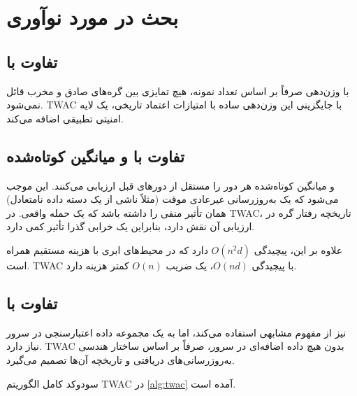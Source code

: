 \section{بحث در مورد نوآوری}
\label{sec:innovation_discussion}

\subsection{تفاوت با }

 با وزن‌دهی صرفاً بر اساس تعداد نمونه، هیچ تمایزی بین گره‌های صادق و مخرب قائل نمی‌شود. \gls{TWAC} با جایگزینی این وزن‌دهی ساده با امتیازات اعتماد تاریخی، یک لایه امنیتی تطبیقی اضافه می‌کند.

\subsection{تفاوت با  و میانگین کوتاه‌شده}

 و میانگین کوتاه‌شده هر دور را مستقل از دورهای قبل ارزیابی می‌کنند. این موجب می‌شود که یک به‌روزرسانی غیرعادی موقت (مثلاً ناشی از یک دسته داده نامتعادل) همان تأثیر منفی را داشته باشد که یک حمله واقعی. در \gls{TWAC}، تاریخچه رفتار گره در ارزیابی آن نقش دارد، بنابراین یک خرابی گذرا تأثیر کمی دارد.

علاوه بر این،  پیچیدگی $O(n^2 d)$ دارد که در محیط‌های ابری با هزینه مستقیم همراه است. \gls{TWAC} با پیچیدگی $O(nd)$، یک ضریب $O(n)$ کمتر هزینه دارد.

\subsection{تفاوت با }

 نیز از مفهوم مشابهی استفاده می‌کند، اما به یک مجموعه داده اعتبارسنجی در سرور نیاز دارد. \gls{TWAC} بدون هیچ داده اضافه‌ای در سرور، صرفاً بر اساس ساختار هندسی به‌روزرسانی‌های دریافتی و تاریخچه آن‌ها تصمیم می‌گیرد.

سودوکد کامل الگوریتم \gls{TWAC} در \autoref{alg:twac} آمده است.

